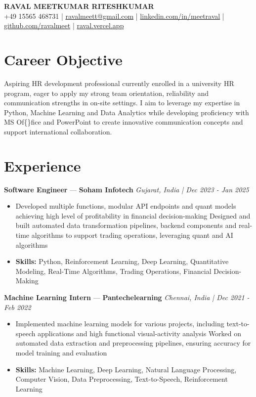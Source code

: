 \documentclass[a4paper,10pt]{article}
\begin{document}
\begin{center}
  {\Large\bfseries RAVAL MEETKUMAR RITESHKUMAR}\\[2pt]
  {\small +49 15565 468731 \;|\; \href{mailto:ravalmeett@gmail.com}{ravalmeett@gmail.com} \;|\; \href{https://www.linkedin.com/in/meetraval/}{linkedin.com/in/meetraval} \;|\; \href{https://github.com/ravalmeet}{github.com/ravalmeet} \;|\; \href{https://raval.vercel.app/}{raval.vercel.app}}
\end{center}
\vspace{-3pt}

\section*{Career Objective}
Aspiring HR development professional currently enrolled in a university HR program, eager to apply my strong team orientation, reliability and communication strengths in on-site settings. I aim to leverage my expertise in Python, Machine Learning and Data Analytics while developing proficiency with MS Of\{\}fice and PowerPoint to create innovative communication concepts and support international collaboration.\par

\section*{Experience}
\textbf{Software Engineer} — \textbf{Soham Infotech} \hfill \textit{Gujarat, India \;|\; Dec 2023 - Jan 2025}\par
\vspace{1pt}
\begin{itemize}
  \item Developed multiple functions, modular API endpoints and quant models achieving high level of profitability in financial decision-making Designed and built automated data transformation pipelines, backend components and real-time algorithms to support trading operations, leveraging quant and AI algorithms
  \item \textbf{Skills:} Python, Reinforcement Learning, Deep Learning, Quantitative Modeling, Real-Time Algorithms, Trading Operations, Financial Decision-Making
\end{itemize}
\vspace{3pt}
\textbf{Machine Learning Intern} — \textbf{Pantechelearning} \hfill \textit{Chennai, India \;|\; Dec 2021 - Feb 2022}\par
\vspace{1pt}
\begin{itemize}
  \item Implemented machine learning models for various projects, including text-to-speech applications and high functional visual-activity analysis Worked on automated data extraction and preprocessing pipelines, ensuring accuracy for model training and evaluation
  \item \textbf{Skills:} Machine Learning, Deep Learning, Natural Language Processing, Computer Vision, Data Preprocessing, Text-to-Speech, Reinforcement Learning
\end{itemize}
\end{document}
